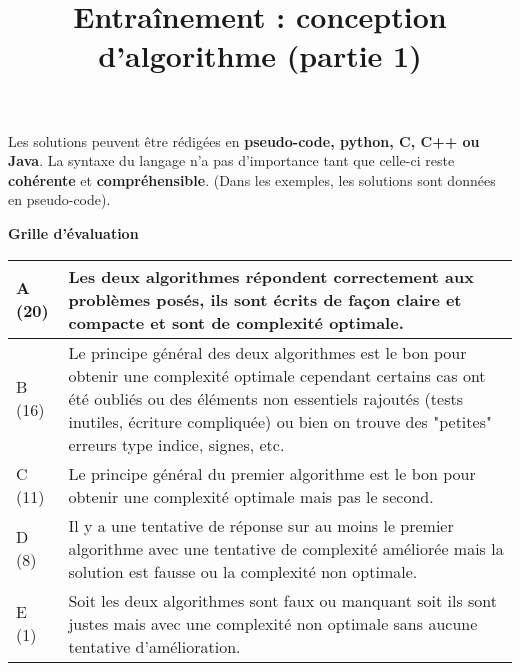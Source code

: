 \documentclass{../cours}
\title{Entraînement : conception d'algorithme (partie 1) }
\begin{document}
\maketitle

Les solutions peuvent être rédigées en \textbf{pseudo-code, python, C, C++ ou Java}. La syntaxe du langage n'a pas d'importance tant que celle-ci reste \textbf{cohérente} et \textbf{compréhensible}. (Dans les exemples, les solutions sont données en pseudo-code).

\textbf{Grille d'évaluation}

\vspace{0.5cm}

\begin{tabular}{|l|p{12cm}|}
\hline
A (20) &\small{Les deux algorithmes répondent correctement aux problèmes posés, ils sont écrits de façon claire et compacte et sont de complexité optimale.}
 \\ \hline
B (16) & \small{Le principe général des deux algorithmes est le bon pour obtenir une complexité optimale cependant certains cas ont été oubliés ou des éléments non essentiels rajoutés (tests inutiles, écriture compliquée) ou bien on trouve des "petites" erreurs type indice, signes, etc. }
 \\ \hline
C (11) & \small{Le principe général du premier algorithme est le bon pour obtenir une complexité optimale mais pas le second.} \\ \hline
D (8) &\small{Il y a une tentative de réponse sur au moins le premier algorithme avec une tentative de complexité améliorée mais la solution est fausse ou la complexité non optimale.} \\ \hline
E (1) & \small{Soit les deux algorithmes sont faux ou manquant soit ils sont justes mais avec une complexité non optimale sans aucune tentative d'amélioration.} \\ \hline
\end{tabular}





\end{document}
